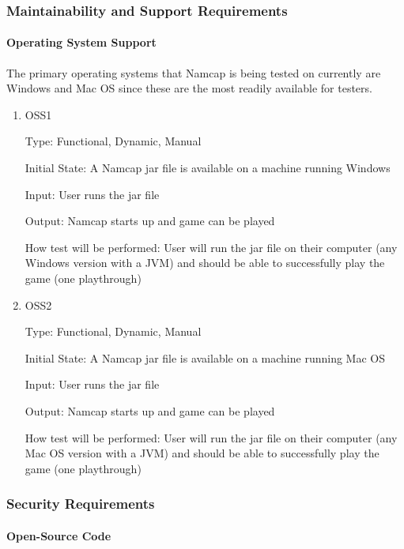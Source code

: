 \documentclass[12pt, titlepage]{article}
\begin{document}
\subsubsection{Maintainability and Support Requirements}

\paragraph{Operating System Support\\}
The primary operating systems that Namcap is being tested on currently are Windows and Mac OS since these are the most readily available for testers.

\begin{enumerate}

\item{OSS1\\}

Type: Functional, Dynamic, Manual
					
Initial State: A Namcap jar file is available on a machine running Windows
					
Input: User runs the jar file
					
Output: Namcap starts up and game can be played
					
How test will be performed: User will run the jar file on their computer (any Windows version with a JVM) and should be able to successfully play the game (one playthrough)

\item{OSS2\\}

Type: Functional, Dynamic, Manual
					
Initial State: A Namcap jar file is available on a machine running Mac OS
					
Input: User runs the jar file
					
Output: Namcap starts up and game can be played
					
How test will be performed: User will run the jar file on their computer (any Mac OS version with a JVM) and should be able to successfully play the game (one playthrough)

\end{enumerate}

\subsubsection{Security Requirements}

\paragraph{Open-Source Code}
\end{document}
